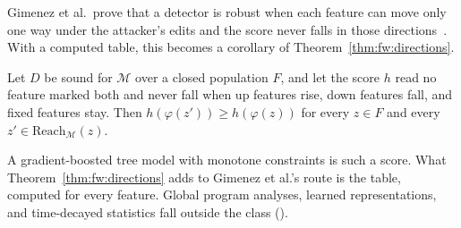 Gimenez et al.\ prove that a detector is robust when each feature can move only one way under the attacker's edits
and the score never falls in those directions~\cite{gimenez2025certifiably}. With a computed table, this becomes a
corollary of Theorem~\ref{thm:fw:directions}.

\corollary[Robustness]
\label{cor:fw:robustness}
{
Let $D$ be sound for $\mathcal{M}$ over a closed population $F$, and let the score $h$ read no feature marked both and
never fall when up features rise, down features fall, and fixed features stay. Then
$h(\varphi(z')) \ge h(\varphi(z))$ for every $z \in F$ and every $z' \in \mathrm{Reach}_\mathcal{M}(z)$.
}

\noindent A gradient-boosted tree model with monotone constraints is such a score. What Theorem~\ref{thm:fw:directions}
adds to Gimenez et al.'s route is the table, computed for every feature. Global program analyses, learned
representations, and time-decayed statistics fall outside the class ().

